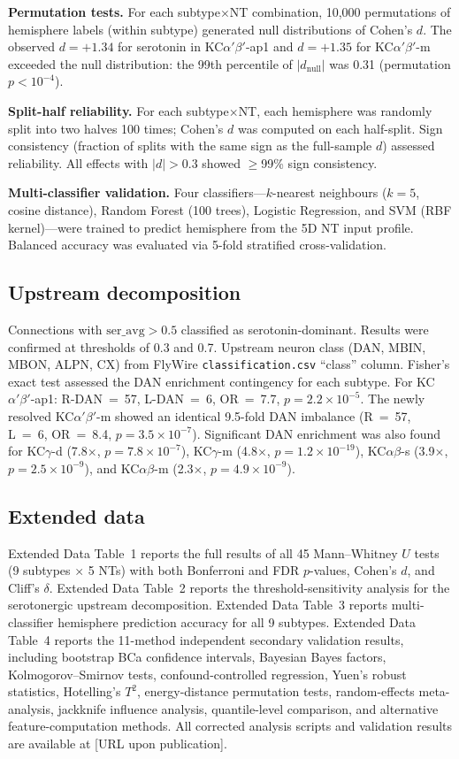 \documentclass[10pt]{article}
\begin{document}
\textbf{Permutation tests.} For each subtype$\times$NT combination, 10,000 permutations of hemisphere labels (within subtype) generated null distributions of Cohen's $d$. The observed $d = +1.34$ for serotonin in KC$\alpha'\beta'$-ap1 and $d = +1.35$ for KC$\alpha'\beta'$-m exceeded the null distribution: the 99th percentile of $|d_\mathrm{null}|$ was 0.31 (permutation $p < 10^{-4}$).

\textbf{Split-half reliability.} For each subtype$\times$NT, each hemisphere was randomly split into two halves 100 times; Cohen's $d$ was computed on each half-split. Sign consistency (fraction of splits with the same sign as the full-sample $d$) assessed reliability. All effects with $|d| > 0.3$ showed $\geq$99\% sign consistency.

\textbf{Multi-classifier validation.} Four classifiers---$k$-nearest neighbours ($k = 5$, cosine distance), Random Forest (100 trees), Logistic Regression, and SVM (RBF kernel)---were trained to predict hemisphere from the 5D NT input profile. Balanced accuracy was evaluated via 5-fold stratified cross-validation.

\subsection*{Upstream decomposition}
Connections with $\mathrm{ser\_avg} > 0.5$ classified as serotonin-dominant. Results were confirmed at thresholds of 0.3 and 0.7. Upstream neuron class (DAN, MBIN, MBON, ALPN, CX) from FlyWire \texttt{classification.csv} ``class'' column. Fisher's exact test assessed the DAN enrichment contingency for each subtype. For KC$\alpha'\beta'$-ap1: R-DAN~=~57, L-DAN~=~6, OR~=~7.7, $p = 2.2 \times 10^{-5}$. The newly resolved KC$\alpha'\beta'$-m showed an identical 9.5-fold DAN imbalance (R~=~57, L~=~6, OR~=~8.4, $p = 3.5 \times 10^{-7}$). Significant DAN enrichment was also found for KC$\gamma$-d (7.8$\times$, $p = 7.8 \times 10^{-7}$), KC$\gamma$-m (4.8$\times$, $p = 1.2 \times 10^{-19}$), KC$\alpha\beta$-s (3.9$\times$, $p = 2.5 \times 10^{-9}$), and KC$\alpha\beta$-m (2.3$\times$, $p = 4.9 \times 10^{-9}$).

\subsection*{Extended data}
Extended Data Table~1 reports the full results of all 45 Mann--Whitney $U$ tests (9 subtypes $\times$ 5 NTs) with both Bonferroni and FDR $p$-values, Cohen's $d$, and Cliff's $\delta$. Extended Data Table~2 reports the threshold-sensitivity analysis for the serotonergic upstream decomposition. Extended Data Table~3 reports multi-classifier hemisphere prediction accuracy for all 9 subtypes. Extended Data Table~4 reports the 11-method independent secondary validation results, including bootstrap BCa confidence intervals, Bayesian Bayes factors, Kolmogorov--Smirnov tests, confound-controlled regression, Yuen's robust statistics, Hotelling's $T^2$, energy-distance permutation tests, random-effects meta-analysis, jackknife influence analysis, quantile-level comparison, and alternative feature-computation methods. All corrected analysis scripts and validation results are available at [URL upon publication].
\end{document}
